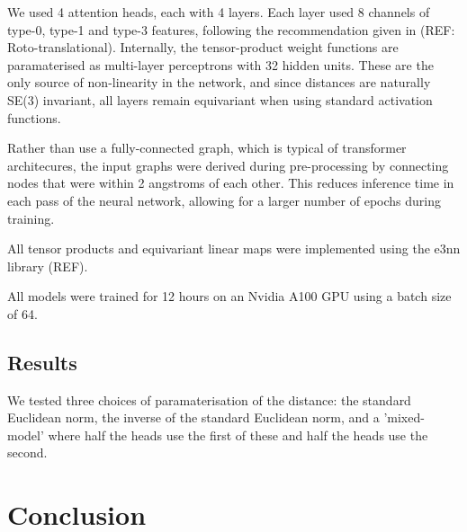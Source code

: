 \documentclass[11pt]{article}
\begin{document}
We used 4 attention heads, each with 4 layers. Each layer used 8 channels of type-0, type-1 and type-3 features, following the recommendation given in (REF: Roto-translational). Internally, the tensor-product weight functions are paramaterised as multi-layer perceptrons with 32 hidden units. These are the only source of non-linearity in the network, and since distances are naturally SE(3) invariant, all layers remain equivariant when using standard activation functions.

Rather than use a fully-connected graph, which is typical of transformer architecures, the input graphs were derived during pre-processing by connecting nodes that were within 2 angstroms of each other. This reduces inference time in each pass of the neural network, allowing for a larger number of epochs during training.  

All tensor products and equivariant linear maps were implemented using the e3nn library (REF).

All models were trained for 12 hours on an Nvidia A100 GPU using a batch size of 64.

\subsection{Results}

We tested three choices of paramaterisation of the distance: the standard Euclidean norm, the inverse of the standard Euclidean norm, and a 'mixed-model' where half the heads use the first of these and half the heads use the second.

\section{Conclusion}
\end{document}
